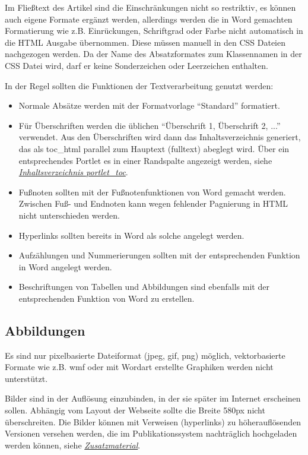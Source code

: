 \documentclass[a4paper,10pt,ngerman]{sphinxmanual}
\begin{document}
Im Fließtext des Artikel sind die Einschränkungen nicht so restriktiv, es
können auch eigene Formate ergänzt werden, allerdings werden die in Word
gemachten Formatierung wie z.B. Einrückungen, Schriftgrad oder Farbe nicht
automatisch in die HTML Ausgabe übernommen. Diese müssen manuell in den CSS
Dateien nachgezogen werden. Da der Name des Absatzformates zum Klassennamen in
der CSS Datei wird, darf er keine Sonderzeichen oder Leerzeichen enthalten.

In der Regel sollten die Funktionen der Textverarbeitung genutzt werden:
\begin{itemize}
\item {} 
Normale Absätze werden mit der Formatvorlage ``Standard'' formatiert.

\item {} 
Für Überschriften werden die üblichen ``Überschrift 1, Überschrift 2, ...''
verwendet. Aus den Überschriften wird dann das Inhaltsverzeichnis generiert,
das als toc\_html parallel zum Hauptext (fulltext) abeglegt wird. Über ein
entsprechendes Portlet es in einer Randspalte angezeigt werden, siehe {\hyperref[portlets:portlet-toc]{\emph{Inhaltsverzeichnis portlet\_toc}}}.

\item {} 
Fußnoten sollten mit der Fußnotenfunktionen von Word gemacht werden. Zwischen
Fuß- und Endnoten kann wegen fehlender Pagnierung in HTML nicht unterschieden
werden.

\item {} 
Hyperlinks sollten bereits in Word als solche angelegt werden.

\item {} 
Aufzählungen und Nummerierungen sollten mit der entsprechenden Funktion in
Word angelegt werden.

\item {} 
Beschriftungen von Tabellen und Abbildungen sind ebenfalls mit der
entsprechenden Funktion von Word zu erstellen.

\end{itemize}


\subsection{Abbildungen}
\label{formatieren:abbildungen}
Es sind nur pixelbasierte Dateiformat (jpeg, gif, png) möglich, vektorbasierte
Formate wie z.B. wmf oder mit Wordart erstellte Graphiken werden nicht
unterstützt.

Bilder sind in der Auflösung einzubinden, in der sie später im Internet
erscheinen sollen. Abhängig vom Layout der Webseite sollte die Breite 580px
nicht überschreiten. Die Bilder können mit Verweisen (hyperlinks) zu
höherauflösenden Versionen versehen werden, die im Publikationssystem
nachträglich hochgeladen werden können, siehe {\hyperref[zusatzmaterial:zusatzmaterial]{\emph{Zusatzmaterial}}}.
\end{document}
